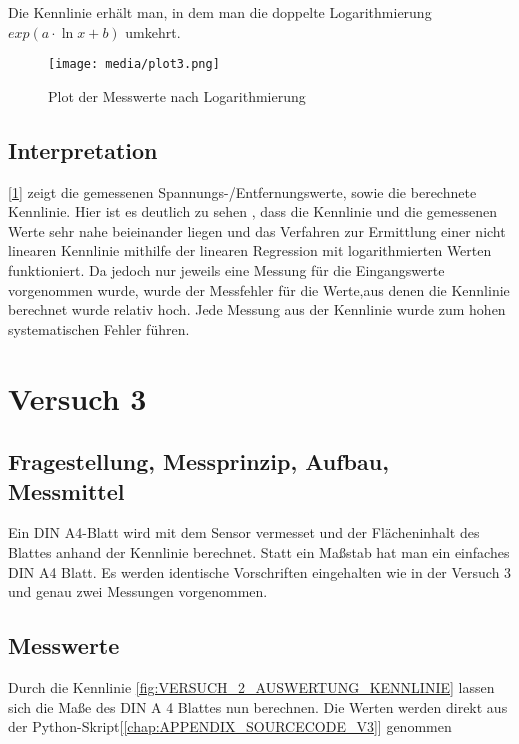 \documentclass[12pt, oneside, a4paper, \docLanguage]{report}
\begin{document}
Die Kennlinie erhält man, in dem man die doppelte Logarithmierung \(exp(a \cdot \ln x + b)\) umkehrt.

\begin{figure}[H]
	\centering\small
	\texttt{[image: media/plot3.png]}
	\caption{Plot der Messwerte nach Logarithmierung}
	\label{fig:VERSUCH_2_AUSWERTUNG_PLOT}
\end{figure}




\section{Interpretation}
\label{chap:VERSUCH_2_INTERPRETATION}

[\ref{fig:VERSUCH_2_AUSWERTUNG_PLOT}] zeigt die gemessenen Spannungs-/Entfernungswerte, sowie die berechnete Kennlinie. 
Hier ist es deutlich zu sehen , dass die Kennlinie und die gemessenen Werte sehr nahe beieinander liegen und das Verfahren zur Ermittlung einer nicht linearen Kennlinie mithilfe der linearen Regression mit logarithmierten Werten funktioniert.
Da jedoch nur jeweils eine Messung für die Eingangswerte vorgenommen wurde, wurde der Messfehler für die Werte,aus denen die Kennlinie berechnet wurde relativ hoch.
Jede Messung aus der Kennlinie wurde zum hohen systematischen Fehler führen.

%
%
\chapter{Versuch 3}
\label{chap:Flächenmessung mit Fehlerrechnung}

\section{Fragestellung, Messprinzip, Aufbau, Messmittel}
\label{chap:VERSUCH_3_FRAGESTELLUNG}
Ein DIN A4-Blatt wird mit dem Sensor vermesset und der Flächeninhalt des Blattes anhand der Kennlinie berechnet. Statt ein Maßstab hat man ein einfaches DIN A4 Blatt. 
Es werden identische Vorschriften eingehalten wie in der Versuch 3 und genau zwei Messungen vorgenommen. 

\section{Messwerte}
\label{chap:VERSUCH_3_MESSWERTE}
Durch die Kennlinie \ref{fig:VERSUCH_2_AUSWERTUNG_KENNLINIE} lassen sich die Maße des DIN A 4 Blattes nun berechnen. Die Werten werden direkt aus der Python-Skript[\ref{chap:APPENDIX_SOURCECODE_V3}] genommen
\end{document}
